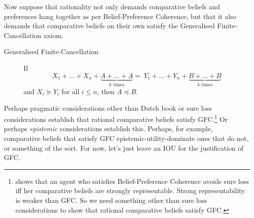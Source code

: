 Now suppose that rationality not only demands comparative beliefs and preferences hang together as per Belief-Preference Coherence, but that it also demands that comparative beliefs on their own satisfy the Generalised Finite-Cancellation axiom.
\begin{description}
\item[Generalised Finite-Cancellation] If
	$$
	  X_1+\ldots+X_n+\underbrace{A+\hdots+A}_{\text{$k$ times}} = \
	    Y_1+\ldots+Y_n+\underbrace{B+\hdots+B}_{\text{$k$ times}}
	$$
and $X_i\succeq Y_i$ for all $i\leq n$, then $A\preceq B$.
\end{description}
Perhaps pragmatic considerations other than Dutch book or sure loss considerations establish that rational comparative beliefs satisfy GFC.\footnote{\citet{Icard2016} shows that an agent who satisfies Belief-Preference Coherence avoids sure loss iff her comparative beliefs are strongly representable. Strong representability is weaker than GFC. So we need something other than sure loss considerations to show that rational comparative beliefs satisfy GFC.} Or perhaps \textit{epistemic} considerations establish this. Perhaps, for example, comparative beliefs that satisfy GFC epistemic-utility-dominate ones that do not, or something of the sort. For now, let's just leave an IOU for the justification of GFC.

